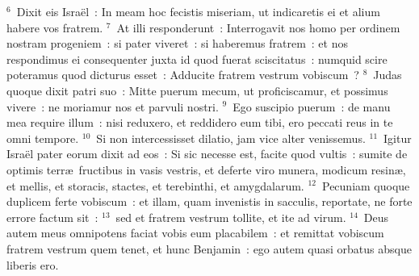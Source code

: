 ${}^{6}$~Dixit eis Isra\"el~: In meam hoc fecistis miseriam, ut indicaretis ei et alium habere vos fratrem.
${}^{7}$~At illi responderunt~: Interrogavit nos homo per ordinem nostram progeniem~: si pater viveret~: si haberemus fratrem~: et nos respondimus ei consequenter juxta id quod fuerat sciscitatus~: numquid scire poteramus quod dicturus esset~: Adducite fratrem vestrum vobiscum~?
${}^{8}$~Judas quoque dixit patri suo~: Mitte puerum mecum, ut proficiscamur, et possimus vivere~: ne moriamur nos et parvuli nostri.
${}^{9}$~Ego suscipio puerum~: de manu mea require illum~: nisi reduxero, et reddidero eum tibi, ero peccati reus in te omni tempore.
${}^{10}$~Si non intercessisset dilatio, jam vice alter venissemus.
${}^{11}$~Igitur Isra\"el pater eorum dixit ad eos~: Si sic necesse est, facite quod vultis~: sumite de optimis terr\ae\ fructibus in vasis vestris, et deferte viro munera, modicum resin\ae , et mellis, et storacis, stactes, et terebinthi, et amygdalarum.
${}^{12}$~Pecuniam quoque duplicem ferte vobiscum~: et illam, quam invenistis in sacculis, reportate, ne forte errore factum sit~:
${}^{13}$~sed et fratrem vestrum tollite, et ite ad virum.
${}^{14}$~Deus autem meus omnipotens faciat vobis eum placabilem~: et remittat vobiscum fratrem vestrum quem tenet, et hunc Benjamin~: ego autem quasi orbatus absque liberis ero.


